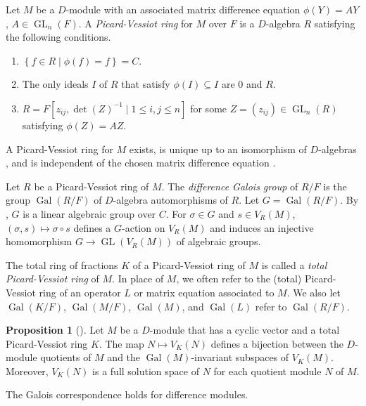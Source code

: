 \documentclass[11pt,reqno]{amsart}
\theoremstyle{definition}
\newtheorem{proposition}[theorem]{Proposition}
\DeclareMathOperator{\GL}{GL}
\DeclareMathOperator{\Gal}{Gal}
\begin{document}
Let $M$ be a $D$-module with an associated matrix difference equation $\phi (Y)=AY$, $A\in \GL_{n}(F)$. 
A \emph{Picard-Vessiot ring} for $M$ over $F$ is a $D$-algebra $R$ satisfying the following conditions.
\begin{enumerate}
    \item $\left\lbrace f\in R\mid \phi(f)=f\right\rbrace = C$.
    \item The only ideals $I$ of $R$ that satisfy $\phi(I)\subseteq I$ are $0$ and $R$.
    \item $R = F[z_{ij},\det(Z)^{-1}\mid 1\le i, j\le n]$ for some $Z = (z_{ij})\in \GL_{n}(R)$ satisfying $\phi(Z)=AZ$.
\end{enumerate}

A Picard-Vessiot ring for $M$ exists, is unique up to an isomorphism of $D$-algebras \cite[Proposition 1.9]{put2006galois}, and is independent of the chosen matrix difference equation \cite[page 24]{put2006galois}.

Let $R$ be a Picard-Vessiot ring of $M$. The \emph{difference Galois group} of $R/F$ is the group $\Gal(R/F)$ of $D$-algebra automorphisms of $R$. Let $G=\Gal(R/F)$. By \cite[Theorem 1.13]{put2006galois}, $G$ is a linear algebraic group over $C$. For $\sigma\in G$ and $s\in V_{R}(M)$, $(\sigma,s)\mapsto\sigma\circ s$ defines a $G$-action on $V_{R}(M)$ and induces an injective homomorphism $G\to \GL(V_{R}(M))$ of algebraic groups. 

The total ring of fractions $K$ of a Picard-Vessiot ring of $M$ is called a \emph{total Picard-Vessiot ring} of $M$. In place of $M$, we often refer to the (total) Picard-Vessiot ring of an operator $L$ or matrix equation associated to $M$. We also let $\Gal(K/F)$, $\Gal(M/F)$, $\Gal(M)$, and $\Gal(L)$ refer to $\Gal(R/F)$.

\begin{proposition}
[{\cite[Corollary A.7]{hendricks1999solving}}]
\label{prop:solution-space-correspondence}
    Let $M$ be a $D$-module that has a cyclic vector and a total Picard-Vessiot ring $K$. The map $N\mapsto V_K(N)$ defines a bijection between the $D$-module quotients of $M$ and the $\Gal(M)$-invariant subspaces of $V_K(M)$. Moreover, $V_K(N)$ is a full solution space of $N$ for each quotient module $N$ of $M$.
\end{proposition}

The Galois correspondence holds for difference modules.
\end{document}
